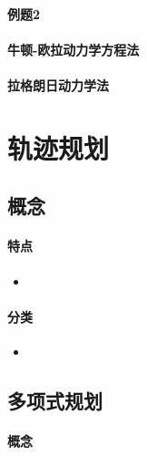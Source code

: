 \documentclass[
12pt, %
a4paper, 
oneside, %
headinclude,footinclude, %
]{scrartcl}
\begin{document}
{\paragraph{例题2}

\paragraph{牛顿-欧拉动力学方程法}

\paragraph{拉格朗日动力学法}

}
\section{轨迹规划}
\subsection[概念]{概念}
\paragraph{特点}
\begin{itemize}
\item 
\end{itemize}
\paragraph{分类}
\begin{itemize}
\item 
\end{itemize}
\subsection[多项式规划]{多项式规划}
\paragraph{概念}
\end{document}
